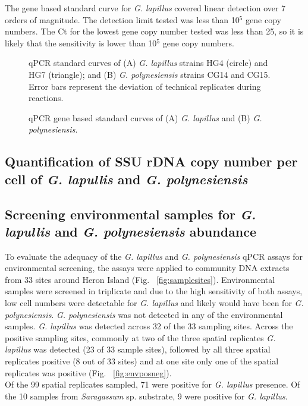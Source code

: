 \documentclass[12pt]{article}
\begin{document}
The gene based standard curve for \emph{G. lapillus} covered linear detection over 7 orders of magnitude. The detection limit tested was less than 10$^{5}$ gene copy numbers. The Ct for the lowest gene copy number tested was less than 25, so it is likely that the sensitivity is lower than 10$^{5}$ gene copy numbers.
\FloatBarrier
\begin{figure}
\caption{qPCR standard curves of (A) \emph{G. lapillus} strains HG4 (circle) and HG7 (triangle); and (B) \emph{G. polynesiensis} strains CG14 and CG15. Error bars represent the deviation of technical replicates during reactions.}
\label{fig:stdCurve}
\caption{qPCR gene based standard curves of (A) \emph{G. lapillus} and (B) \emph{G. polynesiensis}.} %
\label{fig:lapigblocks}
\end{figure}
\FloatBarrier

\subsection{Quantification of SSU rDNA copy number per cell of \emph{G. lapullis} and \emph{G. polynesiensis}}

\subsection{Screening environmental samples for \emph{G. lapullis} and \emph{G. polynesiensis} abundance}
To evaluate the adequacy of the \emph{G. lapillus} and \emph{G. polynesiensis} qPCR assays for environmental screening, the assays were applied to community DNA extracts from 33 sites around Heron Island (Fig. ~\ref{fig:samplesites}). Environmental samples were screened in triplicate and due to the high sensitivity of both assays, low cell numbers were detectable for \emph{G. lapillus} and likely would have been for \emph{G. polynesiensis}.
\emph{G. polynesiensis} was not detected in any of the environmental samples.
\emph{G. lapillus} was detected across 32 of the 33 sampling sites. Across the positive sampling sites, commonly at two of the three spatial replicates \emph{G. lapillus} was detected (23 of 33 sample sites), followed by all three spatial replicates positive (8 out of 33 sites) and at one site only one of the spatial replicates was positive (Fig. ~\ref{fig:envposneg}). \\
Of the 99 spatial replicates sampled, 71 were positive for \emph{G. lapillus} presence. Of the 10 samples from \emph{Saragassum} sp. substrate, 9 were positive for \emph{G. lapillus}. 
\end{document}
